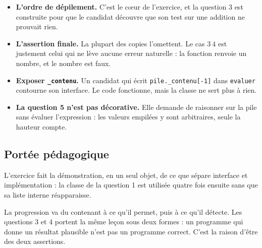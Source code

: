 \begin{itemize}
  \item \textbf{L'ordre de dépilement.} C'est le cœur de l'exercice, et la
    question 3 est construite pour que le candidat découvre que son test sur
    une addition ne prouvait rien.
  \item \textbf{L'assertion finale.} La plupart des copies l'omettent. Le cas
    $3\ 4$ est justement celui qui ne lève aucune erreur naturelle : la
    fonction renvoie un nombre, et le nombre est faux.
  \item \textbf{Exposer \lstinline{_contenu}.} Un candidat qui écrit
    \lstinline{pile._contenu[-1]} dans \lstinline{evaluer} contourne son
    interface. Le code fonctionne, mais la classe ne sert plus à rien.
  \item \textbf{La question 5 n'est pas décorative.} Elle demande de raisonner
    sur la pile sans évaluer l'expression : les valeurs empilées y sont
    arbitraires, seule la hauteur compte.
\end{itemize}

\subsection*{Portée pédagogique}

L'exercice fait la démonstration, en un seul objet, de ce que sépare
interface et implémentation : la classe de la question 1 est utilisée quatre
fois ensuite sans que sa liste interne réapparaisse.

La progression va du contenant à ce qu'il permet, puis à ce qu'il détecte. Les
questions 3 et 4 portent la même leçon sous deux formes : un programme qui
donne un résultat plausible n'est pas un programme correct. C'est la raison
d'être des deux assertions.
